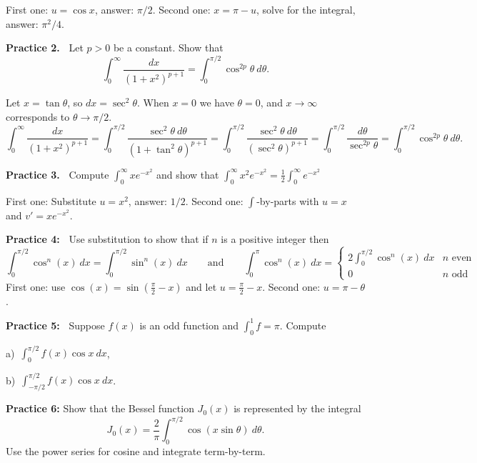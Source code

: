 \documentclass[12pt]{article}
\theoremstyle{definition}
\theoremstyle{remark}
\theoremstyle{definition}
\begin{document}
{\small First one: $u=\cos x$, answer: $\pi/2$. Second one: $x=\pi-u$, solve for the integral, answer: $\pi^2/4$.}

\vskip10pt
{\bf Practice 2.\ } Let $p>0$ be a constant. Show that 
\[\int_0^\infty \frac{dx}{(1+x^2)^{p+1}}=\int_0^{\pi/2}\cos^{2p}\theta\ d\theta.\]

{\small
Let $x=\tan\theta$, so $dx=\sec^2\theta$. When $x=0$ we have $\theta=0$, and $x\to\infty$ corresponds to $\theta\to\pi/2$. 
\[\int_0^\infty \frac{dx}{(1+x^2)^{p+1}}=
\int_0^{\pi/2}\frac{\sec^2\theta\ d\theta}{(1+\tan^2\theta)^{p+1}}=
\int_0^{\pi/2}\frac{\sec^2\theta\ d\theta}{(\sec^2\theta)^{p+1}}=
\int_0^{\pi/2}\frac{d\theta}{\sec^{2p}\theta}=
\int_0^{\pi/2}\cos^{2p}\theta\ d\theta.\]}

\vskip10pt

{\bf Practice 3.\ }  Compute $\int_0^\infty xe^{-x^2}$ and show that 
$\int_0^\infty x^2e^{-x^2}=\frac{1}{2}\int_0^\infty e^{-x^2}$

{\small First one: Substitute $u=x^2$, answer: $1/2$. Second one: $\int$-by-parts with $u=x$ and $v'=xe^{-x^2}$. 
}

\vskip10pt
{\bf Practice 4:\ } Use substitution to show that if $n$ is a positive integer then 
\[\int_0^{\pi/2}\cos^n(x)\ dx=\int_0^{\pi/2}\sin^n(x)\ dx\qquad 
\text{and}\qquad 
\int_0^{\pi}\cos^{n}(x)\ dx=
\begin{cases}
2\int_0^{\pi/2}\cos^n(x)\ dx&\text{$n$ even}\\
0&\text{$n$ odd}
\end{cases}
\]
{\small
First one: use $\cos(x)=\sin(\frac{\pi}{2}-x)$ and let $u=\frac{\pi}{2}-x$. Second one: $u=\pi-\theta$. 
}


\vskip10pt
{\bf Practice 5:\ } Suppose $f(x)$ is an odd function and $\int_0^1f=\pi$. Compute

a)\ $\displaystyle\int_0^{\pi/2}f(x)\cos x\ dx$,

b)\ $\displaystyle\int_{-\pi/2}^{\pi/2}f(x)\cos x\ dx$.




{\bf Practice 6:} Show that the Bessel function $J_0(x)$ is represented by the integral 
\[J_0(x)=\frac{2}{\pi}\int_0^{\pi/2} \cos(x\sin \theta)\ d\theta.
\]
\vskip10pt
{\small Use the power series for cosine and integrate term-by-term. }
\end{document}
